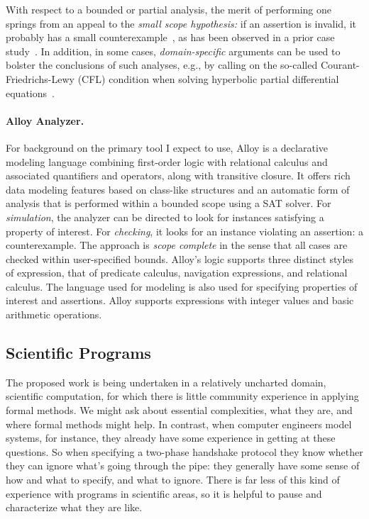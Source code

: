 \documentclass[11pt]{article}
\begin{document}
With respect to a bounded or partial analysis, the merit of performing
one springs from an appeal to the \emph{small scope hypothesis:} if an
assertion is invalid, it probably has a small
counterexample~\citep{jackson1996}, as has been observed in a prior
case study~\citep{baugh2017}.  In addition, in some cases,
\emph{domain-specific} arguments can be used to bolster the
conclusions of such analyses, e.g., by calling on the so-called
Courant-Friedrichs-Lewy (CFL) condition when solving hyperbolic
partial differential equations~\citep{baugh2017,altuntas2017asm}.

\paragraph{Alloy Analyzer.} For background on the primary tool
I expect to use, Alloy is a declarative modeling language combining
first-order logic with relational calculus and associated quantifiers
and operators, along with transitive closure.  It offers rich data
modeling features based on class-like structures and an automatic form
of analysis that is performed within a bounded scope using a SAT
solver.  For \emph{simulation}, the analyzer can be directed to look
for instances satisfying a property of interest.  For
\emph{checking}, it looks for an instance violating an assertion: a
counterexample.  The approach is \emph{scope complete} in the sense
that all cases are checked within user-specified bounds.  Alloy's
logic supports three distinct styles of expression, that of predicate
calculus, navigation expressions, and relational calculus.  The
language used for modeling is also used for specifying properties of
interest and assertions.  Alloy supports expressions with integer
values and basic arithmetic operations.

\subsection{Scientific Programs}

The proposed work is being undertaken in a relatively uncharted
domain, scientific computation, for which there is little community
experience in applying formal methods.  We might ask about essential
complexities, what they are, and where formal methods might help.  In
contrast, when computer engineers model systems, for instance, they
already have some experience in getting at these questions.  So when
specifying a two-phase handshake protocol they know whether they can
ignore what's going through the pipe: they generally have some sense
of how and what to specify, and what to ignore.  There is far less of
this kind of experience with programs in scientific areas, so it is
helpful to pause and characterize what they are like.
\end{document}
